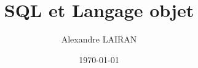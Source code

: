 \documentclass{beamer}
\title{SQL et Langage objet}
\author{Alexandre LAIRAN}
\date{\today}
\begin{document}
\begin{frame}
\titlepage
\end{frame}


\end{document}
